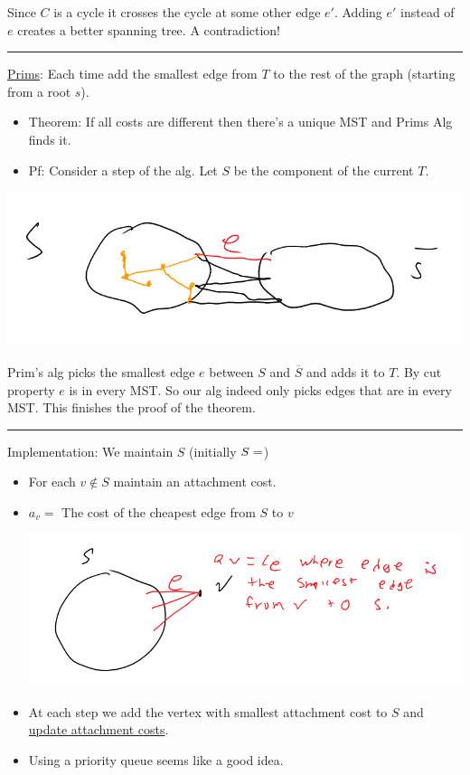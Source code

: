 \documentclass[11pt]{article}
\begin{document}
Since \(C\) is a cycle it crosses the cycle at some other edge \(e'\). Adding \(e'\) instead of \(e\) creates a better spanning tree. A contradiction!

\noindent\rule{\textwidth}{0.5pt}
\uline{Prims}: Each time add the smallest edge from \(T\) to the rest of the graph (starting from a root \(s\)).
\begin{itemize}
\item Theorem: If all costs are different then there's a unique MST and Prims Alg finds it.
\item Pf: Consider a step of the alg. Let \(S\) be the component of the current \(T\).
\end{itemize}
\begin{center}
\includegraphics[width=.9\linewidth]{./Images/i51.png}
\end{center}
Prim's alg picks the smallest edge \uline{\(e\)} between \(S\) and \(\overline{S}\) and adds it to \(T\). By cut property \(e\) is in every MST. So our alg indeed only picks edges that are in every MST. This finishes the proof of the theorem. 

\noindent\rule{\textwidth}{0.5pt}
Implementation: We maintain \(S\) (initially \(S=\empty\))
\begin{itemize}
\item For each \(v \notin S\) maintain an attachment cost.
\item \(a_v =\) The cost of the cheapest edge from \(S\) to \(v\)
\begin{center}
\includegraphics[width=.9\linewidth]{./Images/i52.png}
\end{center}
\item At each step we add the vertex with smallest attachment cost to \(S\) and \uline{update attachment costs}.
\item Using a priority queue seems like a good idea.
\end{itemize}
\end{document}
